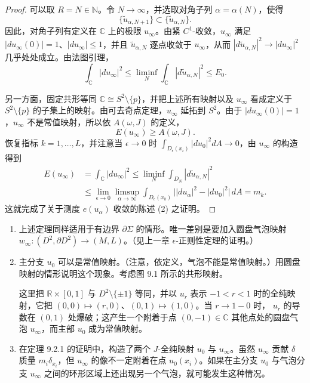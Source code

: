 \begin{proof}
可以取 $R=N\in\mathbb N$。令 $N\to\infty$，并选取对角子列
$\alpha=\alpha(N)$，使得
\[
 \{\widetilde u_{\alpha,N+1}\}\subset
 \{\widetilde u_{\alpha,N}\}.
\]
因此，对角子列有定义在 $\mathbb C$ 上的极限 $u_\infty$。由紧
$C^1$-收敛，$u_\infty$ 满足
$|du_\infty(0)|=1$、$|du_\infty|\leq1$，并且
$\widetilde u_{\alpha,N}$ 逐点收敛于 $u_\infty$，从而
$|d\widetilde u_{\alpha,N}|^2\to|du_\infty|^2$ 几乎处处成立。由法图引理，
\[
 \int_{\mathbb C}|du_\infty|^2
 \leq\liminf_N\int_{\mathbb C}|d\widetilde u_{\alpha,N}|^2
 \leq E_0.
\]

另一方面，固定共形等同
$\mathbb C\cong S^2\setminus\{p\}$，并把上述所有映射以及
$u_\infty$ 看成定义于 $S^2\setminus\{p\}$ 的子集上的映射。由可去奇点定理，$u_\infty$ 延拓到 $S^2$。由于
$|du_\infty(0)|=1$，$u_\infty$ 不是常值映射，所以依 $A(\omega,J)$ 的定义，
\[
 E(u_\infty)\geq A(\omega,J).
\]
恢复指标 $k=1,\ldots,L$，并注意当 $\epsilon\to0$ 时
$\int_{D_\epsilon(x_i)}|du_0|^2dA\to0$，由 $u_\infty$ 的构造得到
\[
\begin{split}
 E(u_\infty)
 &=\int_{\mathbb C}|du_\infty|^2
 \leq\liminf_N\int_{D_N}|d\widetilde u_{\alpha,N}|^2\\
 &\leq\lim_{\epsilon\to0}\limsup_{\alpha\to\infty}
 \int_{D_\epsilon(x_k)}
 \bigl||du_\alpha|^2-|du_0|^2\bigr|\,dA
 =m_k.
\end{split}
\]
这就完成了关于测度 $e(u_\alpha)$ 收敛的陈述 (2) 之证明。
\end{proof}

\begin{remark}\label{rem:bubbling-boundary-principal-components}
\begin{enumerate}[label=(\arabic*)]
 \item 上述定理同样适用于有边界 $\partial\Sigma$ 的情形。唯一差别是要加入圆盘气泡映射
 $w_\infty:(D^2,\partial D^2)\to(M,L)$。（见上一章 $\epsilon$-正则性定理的证明。）
 \item 主分支 $u_0$ 可以是常值映射。（注意，依定义，气泡不能是常值映射。）用圆盘映射的情形说明这个现象。考虑图 9.1 所示的共形映射。

 这里把 $\mathbb R\times[0,1]$ 与 $D^2\setminus\{\pm1\}$ 等同，并以 $u_r$ 表示 $-1<r<1$ 时的全纯映射，它把
 $(0,0)\mapsto(r,0)$、$(0,1)\mapsto(1,0)$。当 $r\to1-0$ 时，
 $u_r$ 的导数在 $(0,1)$ 处爆破；这产生一个附着于点
 $(0,-1)\in\mathbb C$ 其他点处的圆盘气泡 $u_\infty$，而主部
 $u_0$ 成为常值映射。
 \item 在定理 9.2.1 的证明中，构造了两个 $J$-全纯映射
 $u_0$ 与 $u_\infty$。虽然 $u_\infty$ 贡献 $\delta$ 质量
 $m_i\delta_{x_i}$，但 $u_\infty$ 的像不一定附着在点
 $u_0(x_i)$。如果在主分支 $u_0$ 与气泡分支 $u_\infty$ 之间的环形区域上还出现另一个气泡，就可能发生这种情况。
\end{enumerate}
\end{remark}

